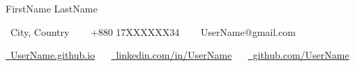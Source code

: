 \begingroup
\centering

{\LARGE\color{ACCENT_COLOR} FirstName LastName}\par

{\fontsize{10pt}{12pt}\selectfont
  \raisebox{-0.1\height}\faHome\ City, Country
  ~~
  \raisebox{-0.1\height}\faPhone\ +880 17XXXXXX34 
  ~~ 
  \raisebox{-0.1\height}\faEnvelope\  UserName@gmail.com
}\par


{\fontsize{10pt}{12pt}\selectfont
  \href{https://UserName.github.io/portfolio/}{\raisebox{-0.1\height}\faGlobe\ UserName.github.io}
  ~~
  \href{https://www.linkedin.com/in/UserName/}{\raisebox{-0.1\height}\faLinkedin\ linkedin.com/in/UserName}
  ~~
  \href{https://github.com/UserName}{\raisebox{-0.1\height}\faGithub\ github.com/UserName}
}


\par
\endgroup
